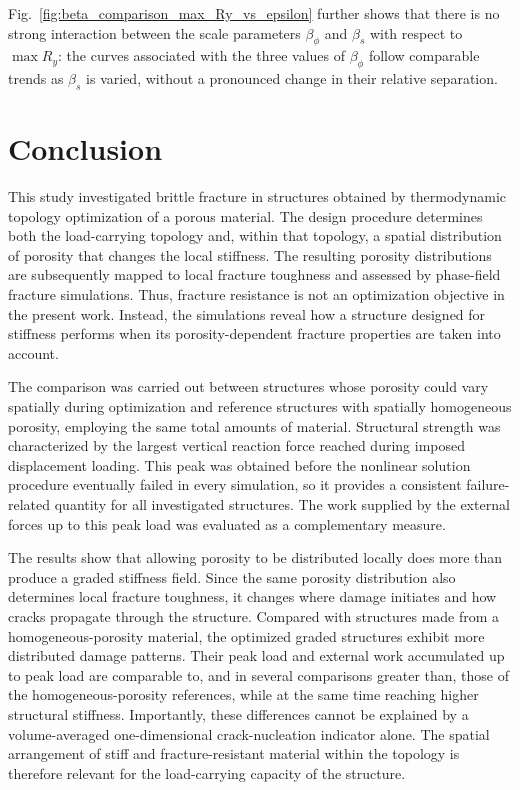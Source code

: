 \documentclass[
	pdflatex,
	sn-mathphys-num
]{sn-jnl}
\theoremstyle{thmstyleone}%
\theoremstyle{thmstyletwo}%
\theoremstyle{thmstylethree}%
\begin{document}
	Fig.~\ref{fig:beta_comparison_max_Ry_vs_epsilon} further
	shows that there is no strong interaction between the scale
	parameters $\beta_{\phi}$ and $\beta_s$ with respect to
	$\max R_y$: the curves associated with the three values of
	$\beta_{\phi}$ follow comparable trends as $\beta_s$ is
	varied, without a pronounced change in their relative
		separation.

\FloatBarrier

\section{Conclusion}\label{sec_conclusions}

This study investigated brittle fracture in structures obtained
by thermodynamic topology optimization of a porous material.
The design procedure determines both the load-carrying
topology and, within that topology, a spatial distribution of
porosity that changes the local stiffness. The resulting
porosity distributions are subsequently mapped to local
fracture toughness and assessed by phase-field fracture
simulations. Thus, fracture resistance is not an optimization
objective in the present work. Instead, the simulations reveal
how a structure designed for stiffness performs when its
porosity-dependent fracture properties are taken into account.

The comparison was carried out between structures whose
porosity could vary spatially during optimization and reference
structures with spatially homogeneous porosity, employing the same total
amounts of material. Structural strength was characterized by
the largest vertical reaction force reached during imposed
displacement loading. This peak was obtained before the
nonlinear solution procedure eventually failed in every
simulation, so it provides a consistent failure-related
quantity for all investigated structures. The work supplied by
the external forces up to this peak load was evaluated as a
complementary measure.

The results show that allowing porosity to be distributed
locally does more than produce a graded stiffness field. Since
the same porosity distribution also determines local fracture
toughness, it changes where damage initiates and how cracks
propagate through the structure. Compared with structures made
from a homogeneous-porosity material, the optimized graded
structures exhibit more distributed damage patterns. Their
peak load and external work accumulated up to peak load are
comparable to, and in several comparisons greater than, those
of the homogeneous-porosity references, while at the same time reaching higher structural stiffness. Importantly, these
differences cannot be explained by a volume-averaged
one-dimensional crack-nucleation indicator alone. The spatial
arrangement of stiff and fracture-resistant material within the
topology is therefore relevant for the load-carrying capacity
of the structure.
\end{document}
